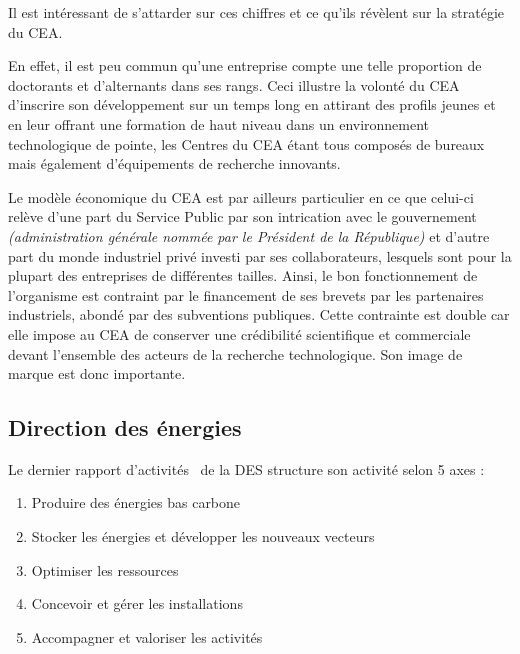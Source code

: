     \begin{bluebox}
        Il est intéressant de s'attarder sur ces chiffres et ce qu'ils révèlent sur la stratégie du \gls{CEA}.

        En effet, il est peu commun qu'une entreprise compte une telle proportion de doctorants et d'alternants dans ses rangs.
        Ceci illustre la volonté du \gls{CEA} d'inscrire son développement sur un temps long en attirant des profils jeunes et en leur offrant une formation de haut niveau dans un environnement technologique de pointe, les Centres du \gls{CEA} étant tous composés de bureaux mais également d'équipements de recherche innovants.

        Le modèle économique du \gls{CEA} est par ailleurs particulier en ce que celui-ci relève d'une part du Service Public par son intrication avec le gouvernement \textit{(administration générale nommée par le Président de la République)} et d'autre part du monde industriel privé investi par ses collaborateurs, lesquels sont pour la plupart des entreprises de différentes tailles.
        Ainsi, le bon fonctionnement de l'organisme est contraint par le financement de ses brevets par les partenaires industriels, abondé par des subventions publiques.
        Cette contrainte est double car elle impose au \gls{CEA} de conserver une crédibilité scientifique et commerciale devant l'ensemble des acteurs de la recherche technologique.
        Son image de marque est donc importante.
    \end{bluebox}

    \newpage\subsection{Direction des énergies}\label{subsec:direction-des-energies}

Le dernier rapport d'activités~\cite{CEA_prez_DES} de la \gls{DES} structure son activité selon 5 axes :
        \begin{enumerate}
            \item Produire des énergies bas carbone
            \item Stocker les énergies et développer les nouveaux vecteurs
            \item Optimiser les ressources
            \item Concevoir et gérer les installations
            \item Accompagner et valoriser les activités
        \end{enumerate}

